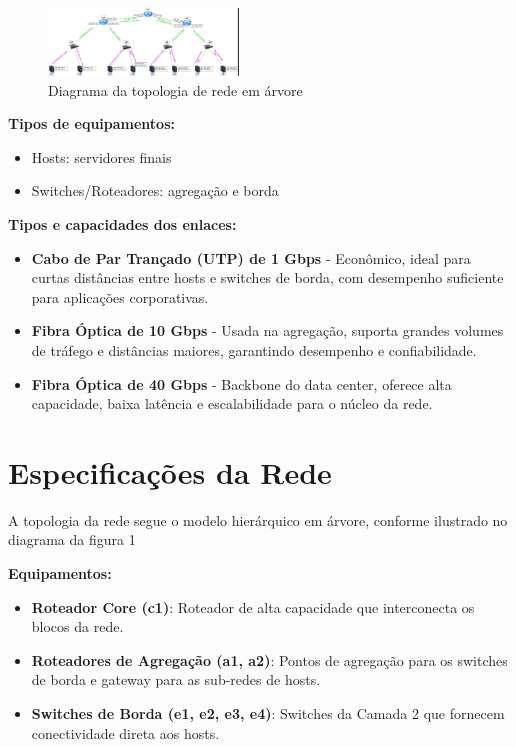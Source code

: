 \documentclass[conference,compsoc]{IEEEtran}
\begin{document}
\begin{otherlanguage}{brazil}
\begin{figure}[!h]
\centering
\includegraphics[width=0.45\textwidth]{../media/diagrama.png}
\caption{Diagrama da topologia de rede em árvore}
\label{fig:topologia_projeto2}
\end{figure}

\textbf{Tipos de equipamentos:}
\begin{itemize}
    \item Hosts: servidores finais
    \item Switches/Roteadores: agregação e borda
\end{itemize}

\textbf{Tipos e capacidades dos enlaces:}
\begin{itemize}
    \item \textbf{Cabo de Par Trançado (UTP) de 1 Gbps} - Econômico, ideal para curtas distâncias entre hosts e switches de borda, com desempenho suficiente para aplicações corporativas.
    \item \textbf{Fibra Óptica de 10 Gbps} - Usada na agregação, suporta grandes volumes de tráfego e distâncias maiores, garantindo desempenho e confiabilidade.
    \item \textbf{Fibra Óptica de 40 Gbps} - Backbone do data center, oferece alta capacidade, baixa latência e escalabilidade para o núcleo da rede.
\end{itemize}

\section{Especificações da Rede}

A topologia da rede segue o modelo hierárquico em árvore, conforme ilustrado no diagrama da figura 1

\textbf{Equipamentos:}
\begin{itemize}
    \item \textbf{Roteador Core (c1)}: Roteador de alta capacidade que interconecta os blocos da rede.
    \item \textbf{Roteadores de Agregação (a1, a2)}: Pontos de agregação para os switches de borda e gateway para as sub-redes de hosts.
    \item \textbf{Switches de Borda (e1, e2, e3, e4)}: Switches da Camada 2 que fornecem conectividade direta aos hosts.
\end{itemize}


\end{otherlanguage}
\end{document}
